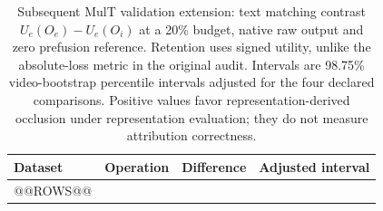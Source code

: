 \begin{table}[!htbp]
\centering\small
\caption{Subsequent MulT validation extension: text matching contrast $U_e(O_e)-U_e(O_i)$ at a 20\% budget, native raw output and zero prefusion reference. Retention uses signed utility, unlike the absolute-loss metric in the original audit. Intervals are 98.75\% video-bootstrap percentile intervals adjusted for the four declared comparisons. Positive values favor representation-derived occlusion under representation evaluation; they do not measure attribution correctness.}\label{tab:mult-extension}
\begin{tabular}{llrr}
\toprule Dataset & Operation & Difference & Adjusted interval\\
\midrule
@@ROWS@@
\bottomrule
\end{tabular}
\end{table}
